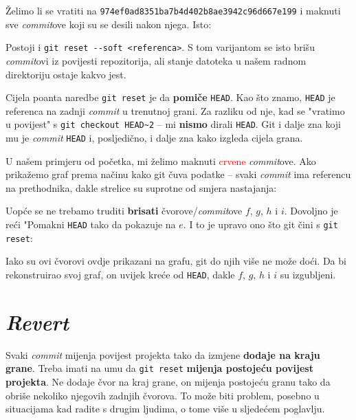 
Želimo li se vratiti na \verb+974ef0ad8351ba7b4d402b8ae3942c96d667e199+ i maknuti sve \emph{commit}ove koji su se desili nakon njega.
Isto:


Postoji i \verb+git reset --soft <referenca>+. 
S tom varijantom se isto brišu \emph{commit}ovi iz povijesti repozitorija, ali stanje datoteka u našem radnom direktoriju ostaje kakvo jest.

Cijela poanta naredbe \verb+git reset+ je da \textbf{pomiče} \verb+HEAD+.
Kao što znamo, \verb+HEAD+ je referenca na zadnji \emph{commit} u trenutnoj grani.
Za razliku od nje, kad se "vratimo u povijest" s \verb+git checkout HEAD~2+ -- mi \textbf{nismo} dirali \verb+HEAD+.
Git i dalje zna koji mu je \emph{commit} \verb+HEAD+ i, posljedično, i dalje zna kako izgleda cijela grana.

U našem primjeru od početka, mi želimo maknuti \textcolor{red}{crvene} \emph{commit}ove. 
Ako prikažemo graf prema načinu kako git čuva podatke -- svaki \emph{commit} ima referencu na prethodnika, dakle strelice su suprotne od smjera nastajanja:



Uopće se ne trebamo truditi \textbf{brisati} čvorove/\emph{commit}ove $f$, $g$, $h$ i $i$.
Dovoljno je reći "Pomakni \verb+HEAD+ tako da pokazuje na $e$.
I to je upravo ono što git čini s \verb+git reset+:



Iako su ovi čvorovi ovdje prikazani na grafu, git do njih više ne može doći.
Da bi rekonstruirao svoj graf, on uvijek kreće od \verb+HEAD+, dakle $f$, $g$, $h$ i $i$ su izgubljeni.

\section*{\emph{Revert}}

Svaki \emph{commit} mijenja povijest projekta tako da izmjene \textbf{dodaje na kraju grane}.
Treba imati na umu da \verb+git reset+ \textbf{mijenja postojeću povijest projekta}.
Ne dodaje čvor na kraj grane, on mijenja postojeću granu tako da obriše nekoliko njegovih zadnjih čvorova.
To može biti problem, posebno u situacijama kad radite s drugim ljudima, o tome više u sljedećem poglavlju.


